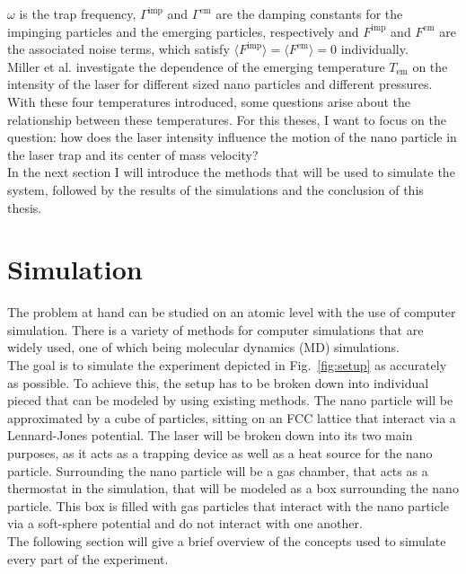 \documentclass[12pt]{article}
\begin{document}
$\omega$ is the trap frequency, $\Gamma^\text{imp}$ and $\Gamma^\text{em}$ are the damping constants for the 
impinging particles and the emerging particles, respectively and $F^\text{imp}$ and $F^\text{em}$ are the associated noise terms, 
which satisfy $\langle F^\text{imp}\rangle= \langle F^\text{em} \rangle = 0$ individually.\\
Miller et al. investigate the dependence of the emerging temperature $T_\text{em}$ on the intensity of the laser for different sized nano particles
and different pressures.\\
With these four temperatures introduced, some questions arise about the relationship between these temperatures. For this theses, I want to focus on
the question: how does the laser intensity influence the motion of the nano particle in the laser trap and its center of mass velocity?\\
In the next section I will introduce the methods that will be used to simulate the system, followed by the results of the simulations and the
conclusion of this thesis.






\newpage
\section{Simulation}
The problem at hand can be studied on an atomic level with the use of computer simulation. There is a variety of methods for computer simulations
that are widely used, one of which being molecular dynamics (MD) simulations.\\ 
The goal is to simulate the experiment depicted in Fig.~\ref{fig:setup} as accurately as possible. To achieve this, the setup has to be broken down
into individual pieced that can be modeled by using existing methods. The nano particle will be approximated by a cube of particles, sitting on an FCC
lattice that interact via a Lennard-Jones potential. The laser will be broken down into its two main purposes, as it acts as a trapping device as well
as a heat source for the nano particle. Surrounding the nano particle will be a gas chamber, that acts as a thermostat in the simulation, that will be
modeled as a box surrounding the nano particle. This box is filled with gas particles that interact with the nano particle via a soft-sphere potential
and do not interact with one another.\\
The following section will give a brief overview of the concepts used to simulate every part of the experiment.
\end{document}
